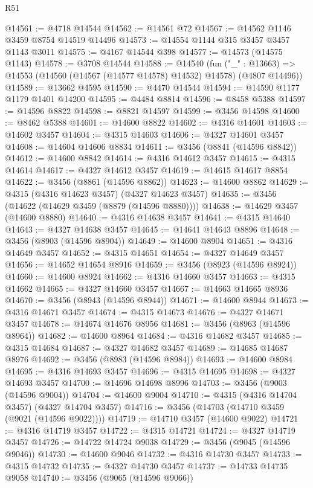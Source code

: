 \begin{lexlean}{R51}
\begin{coremodule}
@14561 := @4718 @14544
@14562 := @14561 @72
@14567 := @14562 @1146 @3459 @8754 @14519 @14496
@14573 := @14554 @1144 @315 @3457 @3457 @1143 @3011
@14575 := @4167 @14544 @398
@14577 := @14573 (@14575 @1143)
@14578 := @3708 @14544
@14588 := @14540
    (fun ("_" : @13663) => @14553 (@14560 (@14567 (@14577 @14578) @14532) @14578) (@4807 @14496))
@14589 := @13662 @4595
@14590 := @4470 @14544
@14594 := @14590 @1177 @1179 @1401 @14200
@14595 := @4484 @8814
@14596 := @8458 @5388
@14597 := @14596 @8822
@14598 := @8821 @14597
@14599 := @3456 @14598
@14600 := @8462 @5388
@14601 := @14600 @8822
@14602 := @4316 @14601
@14603 := @14602 @3457
@14604 := @4315 @14603
@14606 := @4327 @14601 @3457
@14608 := @14604 @14606 @8834
@14611 := @3456 (@8841 (@14596 @8842))
@14612 := @14600 @8842
@14614 := @4316 @14612 @3457
@14615 := @4315 @14614
@14617 := @4327 @14612 @3457
@14619 := @14615 @14617 @8854
@14622 := @3456 (@8861 (@14596 @8862))
@14623 := @14600 @8862
@14629 := @4315 (@4316 @14623 @3457) (@4327 @14623 @3457)
@14635 := @3456 (@14622 (@14629 @3459 (@8879 (@14596 @8880))))
@14638 := @14629 @3457 (@14600 @8880)
@14640 := @4316 @14638 @3457
@14641 := @4315 @14640
@14643 := @4327 @14638 @3457
@14645 := @14641 @14643 @8896
@14648 := @3456 (@8903 (@14596 @8904))
@14649 := @14600 @8904
@14651 := @4316 @14649 @3457
@14652 := @4315 @14651
@14654 := @4327 @14649 @3457
@14656 := @14652 @14654 @8916
@14659 := @3456 (@8923 (@14596 @8924))
@14660 := @14600 @8924
@14662 := @4316 @14660 @3457
@14663 := @4315 @14662
@14665 := @4327 @14660 @3457
@14667 := @14663 @14665 @8936
@14670 := @3456 (@8943 (@14596 @8944))
@14671 := @14600 @8944
@14673 := @4316 @14671 @3457
@14674 := @4315 @14673
@14676 := @4327 @14671 @3457
@14678 := @14674 @14676 @8956
@14681 := @3456 (@8963 (@14596 @8964))
@14682 := @14600 @8964
@14684 := @4316 @14682 @3457
@14685 := @4315 @14684
@14687 := @4327 @14682 @3457
@14689 := @14685 @14687 @8976
@14692 := @3456 (@8983 (@14596 @8984))
@14693 := @14600 @8984
@14695 := @4316 @14693 @3457
@14696 := @4315 @14695
@14698 := @4327 @14693 @3457
@14700 := @14696 @14698 @8996
@14703 := @3456 (@9003 (@14596 @9004))
@14704 := @14600 @9004
@14710 := @4315 (@4316 @14704 @3457) (@4327 @14704 @3457)
@14716 := @3456 (@14703 (@14710 @3459 (@9021 (@14596 @9022))))
@14719 := @14710 @3457 (@14600 @9022)
@14721 := @4316 @14719 @3457
@14722 := @4315 @14721
@14724 := @4327 @14719 @3457
@14726 := @14722 @14724 @9038
@14729 := @3456 (@9045 (@14596 @9046))
@14730 := @14600 @9046
@14732 := @4316 @14730 @3457
@14733 := @4315 @14732
@14735 := @4327 @14730 @3457
@14737 := @14733 @14735 @9058
@14740 := @3456 (@9065 (@14596 @9066))

\end{coremodule}
\end{lexlean}
